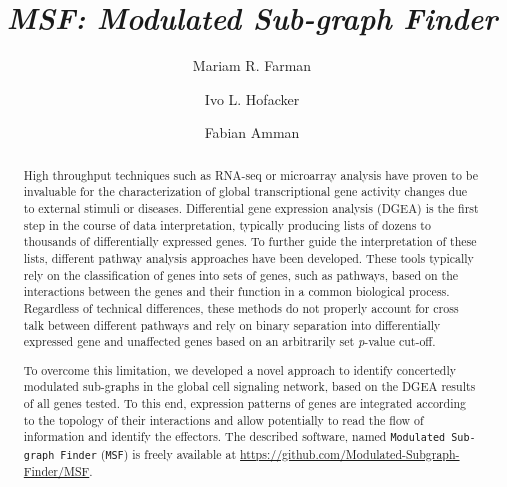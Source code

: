 \documentclass[10pt,a4paper,twocolumn]{article}
\begin{document}
	
	
	\title{\textit{MSF: Modulated Sub-graph Finder} }
	
	\author[1]{Mariam R. Farman}
	\author[1]{Ivo L. Hofacker}
	\author[1,2]{Fabian Amman}
	
	
	
	\maketitle
	\thispagestyle{fancy}
	
	\begin{abstract}
		
		High throughput techniques such as RNA-seq or microarray analysis have
		proven to be invaluable for the characterization of global transcriptional
		gene activity changes due to external stimuli or diseases. Differential
		gene expression analysis (DGEA) is the first step in the course of data
		interpretation, typically producing lists of dozens to thousands of
		differentially expressed genes. To further guide the interpretation of
		these lists, different pathway analysis approaches have been
		developed. These tools typically rely on the classification of genes into
		sets of genes, such as pathways, based on the interactions between the genes
		and their function in a common biological process. Regardless of technical
		differences, these methods do not properly account for cross talk between
		different pathways and rely on binary separation into differentially
		expressed gene and unaffected genes based on an arbitrarily set \textit{p}-value
		cut-off.
		
		To overcome this limitation, we developed a novel
                approach to identify concertedly modulated sub-graphs
                in the global cell signaling network, based on the
                DGEA results of all genes tested. To this end,
                expression patterns of genes are integrated according
                to the topology of their interactions and allow
                potentially to read the flow of information and
                identify the effectors. The described software, named
                \texttt{Modulated Sub-graph Finder} (\texttt{MSF}) is
                freely available at
                \url{https://github.com/Modulated-Subgraph-Finder/MSF}.
		
	\end{abstract}
	
\end{document}
